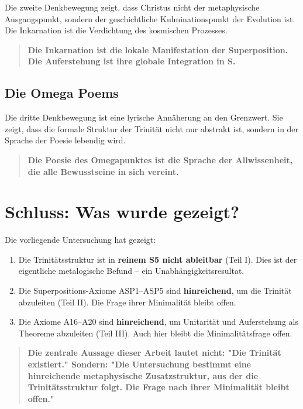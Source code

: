 \documentclass[
]{article}
\begin{document}
Die zweite Denkbewegung zeigt, dass Christus nicht der metaphysische Ausgangspunkt, sondern der geschichtliche Kulminationspunkt der Evolution ist. Die Inkarnation ist die Verdichtung des kosmischen Prozesses.

\begin{quote}
\textbf{Die Inkarnation ist die lokale Manifestation der Superposition. Die Auferstehung ist ihre globale Integration in S.}
\end{quote}

\subsection{Die Omega Poems}

Die dritte Denkbewegung ist eine lyrische Annäherung an den Grenzwert. Sie zeigt, dass die formale Struktur der Trinität nicht nur abstrakt ist, sondern in der Sprache der Poesie lebendig wird.

\begin{quote}
\textbf{Die Poesie des Omegapunktes ist die Sprache der Allwissenheit, die alle Bewusstseine in sich vereint.}
\end{quote}

\section{Schluss: Was wurde gezeigt?}

Die vorliegende Untersuchung hat gezeigt:

\begin{enumerate}
\item Die Trinitätsstruktur ist in \textbf{reinem S5 nicht ableitbar} (Teil I). Dies ist der eigentliche metalogische Befund – ein Unabhängigkeitsresultat.
\item Die Superpositions-Axiome ASP1–ASP5 sind \textbf{hinreichend}, um die Trinität abzuleiten (Teil II). Die Frage ihrer Minimalität bleibt offen.
\item Die Axiome A16–A20 sind \textbf{hinreichend}, um Unitarität und Auferstehung als Theoreme abzuleiten (Teil III). Auch hier bleibt die Minimalitätsfrage offen.
\end{enumerate}

\begin{quote}
\textbf{Die zentrale Aussage dieser Arbeit lautet nicht: "Die Trinität existiert." Sondern: "Die Untersuchung bestimmt eine hinreichende metaphysische Zusatzstruktur, aus der die Trinitätsstruktur folgt. Die Frage nach ihrer Minimalität bleibt offen."}
\end{quote}
\end{document}

